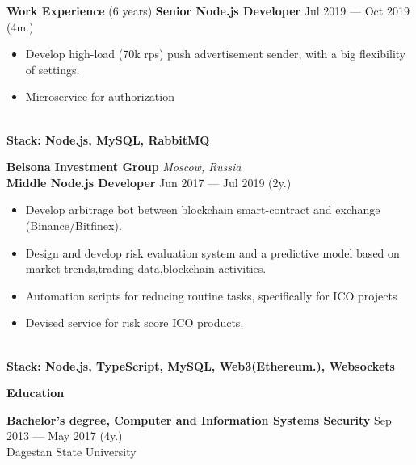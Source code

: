 \documentclass[a4paper]{resume} %
\begin{document}
\begin{rSection}{\textbf{Work Experience} (6 years) }
\textbf{Senior Node.js Developer} \hfill Jul 2019 --- Oct 2019 (4m.)
\begin{itemize}
    \setlength\itemsep{-0.4em}
    \item Develop high-load (70k rps) push advertisement sender, with a big flexibility of settings.
    \item Microservice for authorization
\end{itemize}
\\\textbf{Stack: Node.js, MySQL, RabbitMQ}

\textbf{Belsona Investment Group} \hfill \textit{Moscow, Russia} \\
\textbf{Middle Node.js Developer}  \hfill Jun 2017 --- Jul 2019 (2y.)

\begin{itemize}
    \setlength\itemsep{-0.4em}
    \item Develop arbitrage bot between blockchain smart-contract and exchange (Binance/Bitfinex).
    \item Design and develop risk evaluation system and a predictive model based on market trends,trading data,blockchain activities.
    \item Automation scripts for reducing routine tasks, specifically for ICO projects
    \item Devised service for risk score ICO products.
\end{itemize}
\\\textbf{Stack: Node.js, TypeScript, MySQL, Web3(Ethereum.), Websockets}

\end{rSection}



\begin{rSection}{\textbf{Education}}

\textbf{Bachelor's degree, Computer and Information Systems Security} \hfill {Sep 2013 --- May 2017 (4y.)} \\
	  Dagestan State University

\end{rSection}
\end{document}
